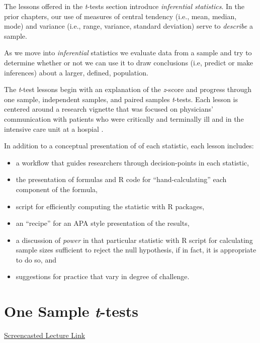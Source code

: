 \documentclass[
  11pt,
]{book}
\providecommand{\tightlist}{%
  \setlength{\itemsep}{0pt}\setlength{\parskip}{0pt}}
\begin{document}
The lessons offered in the \emph{t}-tests section introduce \emph{inferential statistics}. In the prior chapters, our use of measures of central tendency (i.e., mean, median, mode) and variance (i.e., range, variance, standard deviation) serve to \emph{describe} a sample.

As we move into \emph{inferential} statistics we evaluate data from a sample and try to determine whether or not we can use it to draw conclusions (i.e, predict or make inferences) about a larger, defined, population.

The \emph{t}-test lessons begin with an explanation of the \emph{z}-score and progress through one sample, independent samples, and paired samples \emph{t}-tests. Each lesson is centered around a research vignette that was focused on physicians' communication with patients who were critically and terminally ill and in the intensive care unit at a hospial \citep{elliott_differences_2016}.

In addition to a conceptual presentation of of each statistic, each lesson includes:

\begin{itemize}
\tightlist
\item
  a workflow that guides researchers through decision-points in each statistic,
\item
  the presentation of formulas and R code for ``hand-calculating'' each component of the formula,
\item
  script for efficiently computing the statistic with R packages,
\item
  an ``recipe'' for an APA style presentation of the results,
\item
  a discussion of \emph{power} in that particular statistic with R script for calculating sample sizes sufficient to reject the null hypothesis, if in fact, it is appropriate to do so, and
\item
  suggestions for practice that vary in degree of challenge.
\end{itemize}

\hypertarget{tOneSample}{%
\chapter{\texorpdfstring{One Sample \emph{t}-tests}{One Sample t-tests}}\label{tOneSample}}

\href{https://spu.hosted.panopto.com/Panopto/Pages/Viewer.aspx?pid=c029edfb-4215-44be-972d-af0100365877}{Screencasted Lecture Link}
\end{document}
